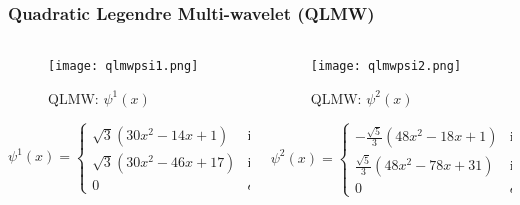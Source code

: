 \begin{frame}\frametitle{Quadratic Legendre Multi-wavelet (QLMW)}

    \begin{columns}[T]
      \begin{column}{.5\textwidth}
      
              \begin{figure}
              \centering
              \texttt{[image: qlmwpsi1.png]}
              \caption{QLMW: $\psi^1(x)$}
              \label{fig_e_vs_n_f1}
              \end{figure}
              \vspace{-4 mm}

              \tiny{
                     \begin{equation}
                  \psi^1(x)=
                  \left\{
                      \begin{array}{ll}
                          \sqrt{3}(30x^2-14x+1)  & \mbox{if } 0 \leq x < \frac{1}{2} \\
                          \sqrt{3}(30x^2-46x+17)  & \mbox{if } \frac{1}{2} \leq x < 1 \\
                          0 & elsewhere
                      \end{array}
                  \right.
              \nonumber
              \end{equation}}


      \end{column}
      \begin{column}{.5\textwidth}
              \begin{figure}
              \centering
              \texttt{[image: qlmwpsi2.png]}
              \caption{QLMW: $\psi^2(x)$}
              \label{fig_e_vs_n_f2}
              \end{figure}
              \vspace{-4 mm}

              \tiny{
                        \begin{equation}
                        \psi^2(x)=
                        \left\{
                            \begin{array}{ll}
                                -\frac{\sqrt{5}}{3}(48x^2-18x+1)  & \mbox{if } 0 \leq x < \frac{1}{2} \\
                                \frac{\sqrt{5}}{3}(48x^2-78x+31)  & \mbox{if } \frac{1}{2} \leq x < 1 \\
                                0 & elsewhere
                            \end{array}
                        \right.
                            \nonumber
                            \end{equation}}
        \end{column}
      \end{columns}
\end{frame}

